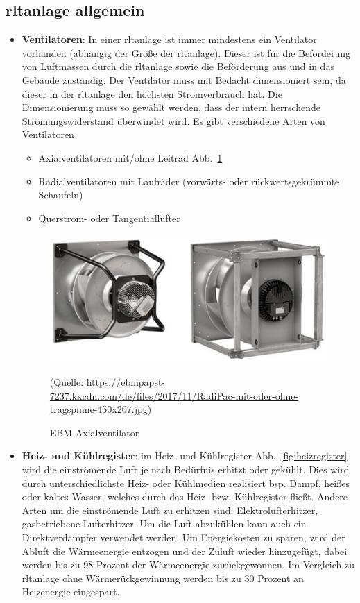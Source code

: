 \subsection{\ac{rltanlage} allgemein}
\begin{itemize}
	\item \textbf{Ventilatoren}: In einer \ac{rltanlage} ist immer mindestens ein Ventilator vorhanden (abhängig der Größe der \ac{rltanlage}). Dieser ist für die Beförderung von Luftmassen durch die \ac{rltanlage} sowie die Beförderung aus und in das Gebäude zuständig. Der Ventilator muss mit Bedacht dimensioniert sein, da dieser in der \ac{rltanlage} den höchsten Stromverbrauch hat. Die Dimensionierung muss so gewählt werden, dass der intern herrschende Strömungswiderstand überwindet wird. Es gibt verschiedene Arten von Ventilatoren 
\begin{itemize}
	\item Axialventilatoren mit/ohne Leitrad Abb.~\ref{fig:EBM_Axialventilator}
	\item Radialventilatoren mit Laufräder (vorwärts- oder rückwertsgekrümmte Schaufeln)
	\item Querstrom- oder Tangentiallüfter 
\end{itemize}

\begin{figure}[H]
	\centering
	\includegraphics[width=0.5\linewidth]{Bilder/axialventilator}
	\caption{EBM Axialventilator} 
	(Quelle: \url{https://ebmpapst-7237.kxcdn.com/de/files/2017/11/RadiPac-mit-oder-ohne-tragspinne-450x207.jpg})
	\label{fig:EBM_Axialventilator}
\end{figure}

	\item \textbf{Heiz- und Kühlregister}: im Heiz- und Kühlregister Abb.~\ref{fig:heizregister} wird die einströmende Luft je nach Bedürfnis erhitzt oder gekühlt. Dies wird durch unterschiedlichste Heiz- oder Kühlmedien realisiert bsp. Dampf, heißes oder kaltes Wasser, welches durch das Heiz- bzw. Kühlregister fließt. Andere Arten um die einströmende Luft zu erhitzen sind: Elektrolufterhitzer, gasbetriebene Lufterhitzer. Um die Luft abzukühlen kann auch ein Direktverdampfer verwendet werden.
	Um Energiekosten zu sparen, wird der Abluft die Wärmeenergie entzogen und der Zuluft wieder hinzugefügt, dabei werden bis zu 98 Prozent der Wärmeenergie zurückgewonnen. Im Vergleich zu \ac{rltanlage} ohne Wärmerückgewinnung werden bis zu 30 Prozent an Heizenergie eingespart. 


\end{itemize}
